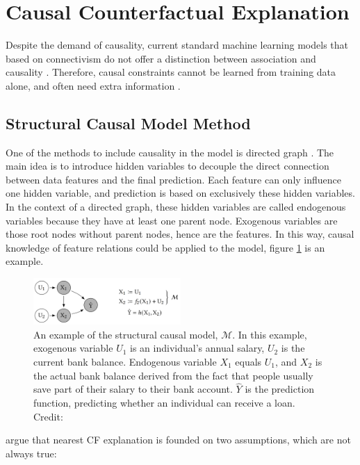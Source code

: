 \section{Causal Counterfactual Explanation}\label{sec:Causality}
Despite the demand of causality, current standard machine learning models that based on connectivism do not offer a distinction between association and causality \cite{diffThatMakesDiff}. Therefore, causal constraints cannot be learned from training data alone, and often need extra information \cite{bookCausality,preservingCausal}.
\subsection{Structural Causal Model Method}
One of the methods to include causality in the model is directed graph \cite{algorithmicrecourse}. The main idea is to introduce hidden variables to decouple the direct connection between data features and the final prediction. Each feature can only influence one hidden variable, and prediction is based on exclusively these hidden variables. In the context of a directed graph, these hidden variables are called endogenous variables because they have at least one parent node. Exogenous variables are those root nodes without parent nodes, hence are the features. In this way, causal knowledge of feature relations could be applied to the model, figure \ref{fig:directedGraph} is an example.
\begin{figure}
  \centering
  \includegraphics[width=0.5\textwidth]{directedGraph.PNG}
  \caption{An example of the structural causal model, $\mathcal{M}$. In this example, exogenous variable $U_1$ is an individual's annual salary, $U_2$ is the current bank balance. Endogenous variable $X_1$ equals $U_1$, and $X_2$ is the actual bank balance derived from the fact that people usually save part of their salary to their bank account. $\hat Y$ is the prediction function, predicting whether an individual can receive a loan. Credit:\cite{algorithmicrecourse}}
  \label{fig:directedGraph}
\end{figure}

\citeauthor{algorithmicrecourse} \cite{algorithmicrecourse} argue that nearest CF explanation is founded on two assumptions, which are not always true:

